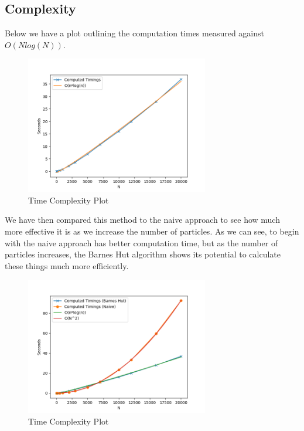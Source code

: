 \subsection{Complexity}
Below we have a plot outlining the computation times measured against $O(Nlog(N))$.
\begin{figure}[htb]
  \begin{center}
    \includegraphics[width=8cm]{../images/nlogn.jpg}
    \caption{Time Complexity Plot}
  \end{center}
\end{figure}

We have then compared this method to the naive approach to see how much more effective it is as we increase the number of particles. As we can see, to begin with the naive approach has better computation time, but as the number of particles increases, the Barnes Hut algorithm shows its potential to calculate these things much more efficiently.
\begin{figure}[htb]
  \begin{center}
    \includegraphics[width=8cm]{../images/complexity_compare.png}
    \caption{Time Complexity Plot}
  \end{center}
\end{figure}
\newpage
